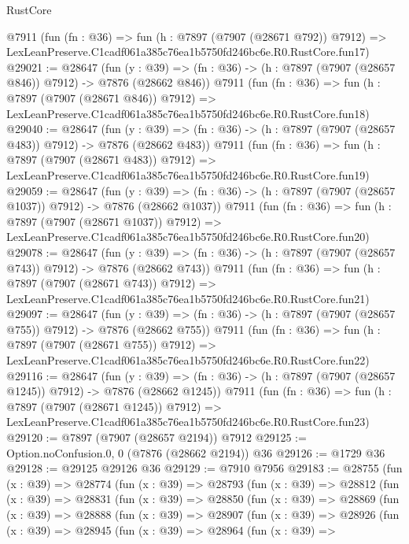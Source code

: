 \begin{lexlean}{RustCore}
\begin{coremodule}
    @7911
    (fun (fn : @36) =>
    fun (h : @7897 (@7907 (@28671 @792)) @7912) =>
    LexLeanPreserve.C1cadf061a385c76ea1b5750fd246bc6e.R0.RustCore.fun17)
@29021 := @28647
    (fun (y : @39) => (fn : @36) -> (h : @7897 (@7907 (@28657 @846)) @7912) -> @7876 (@28662 @846))
    @7911
    (fun (fn : @36) =>
    fun (h : @7897 (@7907 (@28671 @846)) @7912) =>
    LexLeanPreserve.C1cadf061a385c76ea1b5750fd246bc6e.R0.RustCore.fun18)
@29040 := @28647
    (fun (y : @39) => (fn : @36) -> (h : @7897 (@7907 (@28657 @483)) @7912) -> @7876 (@28662 @483))
    @7911
    (fun (fn : @36) =>
    fun (h : @7897 (@7907 (@28671 @483)) @7912) =>
    LexLeanPreserve.C1cadf061a385c76ea1b5750fd246bc6e.R0.RustCore.fun19)
@29059 := @28647
    (fun (y : @39) =>
    (fn : @36) -> (h : @7897 (@7907 (@28657 @1037)) @7912) -> @7876 (@28662 @1037))
    @7911
    (fun (fn : @36) =>
    fun (h : @7897 (@7907 (@28671 @1037)) @7912) =>
    LexLeanPreserve.C1cadf061a385c76ea1b5750fd246bc6e.R0.RustCore.fun20)
@29078 := @28647
    (fun (y : @39) => (fn : @36) -> (h : @7897 (@7907 (@28657 @743)) @7912) -> @7876 (@28662 @743))
    @7911
    (fun (fn : @36) =>
    fun (h : @7897 (@7907 (@28671 @743)) @7912) =>
    LexLeanPreserve.C1cadf061a385c76ea1b5750fd246bc6e.R0.RustCore.fun21)
@29097 := @28647
    (fun (y : @39) => (fn : @36) -> (h : @7897 (@7907 (@28657 @755)) @7912) -> @7876 (@28662 @755))
    @7911
    (fun (fn : @36) =>
    fun (h : @7897 (@7907 (@28671 @755)) @7912) =>
    LexLeanPreserve.C1cadf061a385c76ea1b5750fd246bc6e.R0.RustCore.fun22)
@29116 := @28647
    (fun (y : @39) =>
    (fn : @36) -> (h : @7897 (@7907 (@28657 @1245)) @7912) -> @7876 (@28662 @1245))
    @7911
    (fun (fn : @36) =>
    fun (h : @7897 (@7907 (@28671 @1245)) @7912) =>
    LexLeanPreserve.C1cadf061a385c76ea1b5750fd246bc6e.R0.RustCore.fun23)
@29120 := @7897 (@7907 (@28657 @2194)) @7912
@29125 := Option.noConfusion.{0, 0} (@7876 (@28662 @2194)) @36
@29126 := @1729 @36
@29128 := @29125 @29126 @36
@29129 := @7910 @7956
@29183 := @28755
    (fun (x : @39) =>
    @28774
      (fun (x : @39) =>
      @28793
        (fun (x : @39) =>
        @28812
          (fun (x : @39) =>
          @28831
            (fun (x : @39) =>
            @28850
              (fun (x : @39) =>
              @28869
                (fun (x : @39) =>
                @28888
                  (fun (x : @39) =>
                  @28907
                    (fun (x : @39) =>
                    @28926
                      (fun (x : @39) =>
                      @28945
                        (fun (x : @39) =>
                        @28964
                          (fun (x : @39) =>

\end{coremodule}
\end{lexlean}
